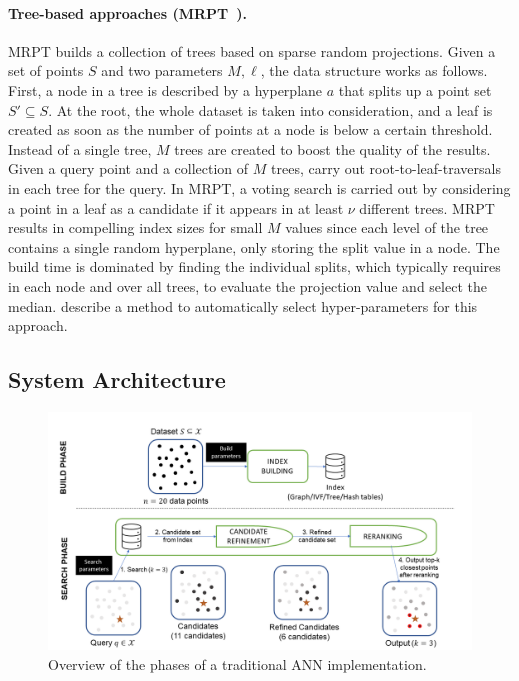 \documentclass[11pt]{article}
\begin{document}
\paragraph{Tree-based approaches
	(MRPT~\cite{DBLP:conf/bigdataconf/HyvonenPTJTWCR16}).} MRPT builds a
collection of trees based on sparse random projections. Given a set of points $S$
and two parameters $M, \ell$, the data structure works as follows. First, a
node in a tree is described by a hyperplane $a$ that splits up a point set
$S' \subseteq S$. At the root, the whole dataset is taken into
consideration, and a leaf is created as soon as the number of points at a
node is below a certain threshold. Instead of a single tree, $M$ trees are
created to boost the quality of the results. Given a query point and a
collection of $M$ trees, carry out root-to-leaf-traversals in each tree for
the query. In MRPT, a voting search is carried out by considering a
point in a leaf as a candidate if it appears in at least $\nu$ different
trees.
MRPT results in compelling index sizes for small $M$ values since each level of the tree contains a single random hyperplane, only storing the split value in a node.
The build time is dominated by finding the individual splits, which typically requires in each node and over all trees, to evaluate the projection value and select the median.
\cite{DBLP:conf/pakdd/JaasaariHR19} describe a method to automatically select hyper-parameters for this approach.


\subsection{System Architecture}

\begin{figure} \includegraphics*[width=\textwidth]{submissions/Matteo2023/figures/pipeline.png}
	\caption{Overview of the phases of a traditional ANN implementation.}
	\label{matteo_fig:pipeline}
\end{figure}
\end{document}
